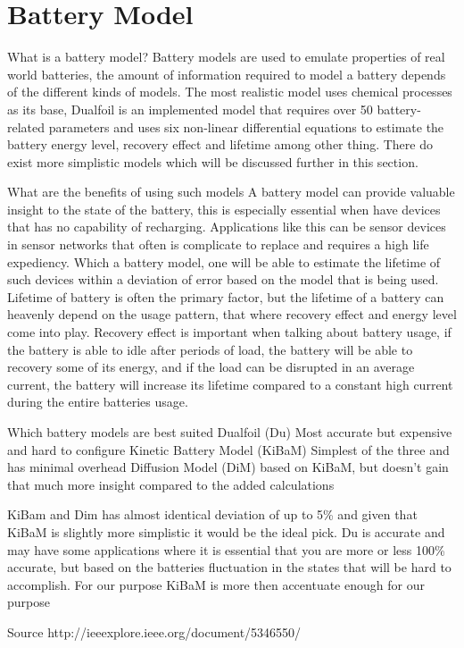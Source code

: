 \section{Battery Model}
What is a battery model?
Battery models are used to emulate properties of real world batteries, the amount of information required to model a battery depends of the different kinds of models. The most realistic model uses chemical processes as its base, Dualfoil is an implemented model that requires over 50 battery-related parameters and uses six non-linear differential equations to estimate the battery energy level, recovery effect and lifetime among other thing. There do exist more simplistic models which will be discussed further in this section.

What are the benefits of using such models
A battery model can provide valuable insight to the state of the battery, this is especially essential when have devices that has no capability of recharging. Applications like this can be sensor devices in sensor networks that often is complicate to replace and requires a high life expediency. Which a battery model, one will be able to estimate the lifetime of such devices within a deviation of error based on the model that is being used. Lifetime of battery is often the primary factor, but the lifetime of a battery can heavenly depend on the usage pattern, that where recovery effect and energy level come into play. Recovery effect is important when talking about battery usage, if the battery is able to idle after periods of load, the battery will be able to recovery some of its energy, and if the load can be disrupted in an average current, the battery will increase its lifetime compared to a constant high current during the entire batteries usage. 

Which battery models are best suited
Dualfoil (Du)
Most accurate but expensive and hard to configure
Kinetic Battery Model (KiBaM)
Simplest of the three and has minimal overhead
Diffusion Model (DiM)
based on KiBaM, but doesn't gain that much more insight compared to the added calculations

KiBam and Dim has almost identical deviation of up to 5\% and given that KiBaM is slightly more simplistic it would be the ideal pick. Du is accurate and may have some applications where it is essential that you are more or less 100\% accurate, but based on the batteries fluctuation in the states that will be hard to accomplish. For our purpose KiBaM is more then accentuate enough for our purpose 

Source
http://ieeexplore.ieee.org/document/5346550/